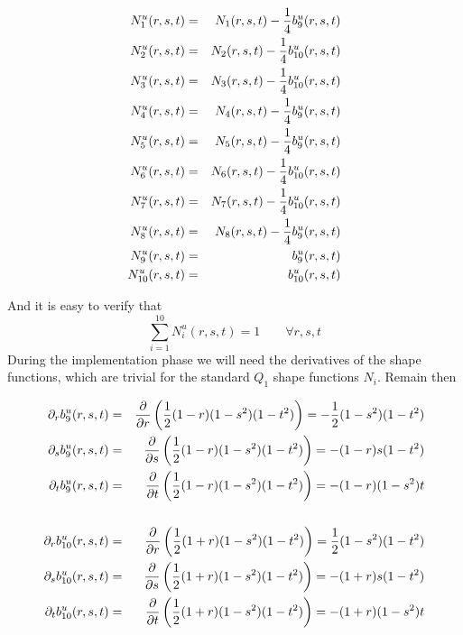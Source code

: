 \begin{mdframed}[backgroundcolor=blue!5]
\begin{eqnarray}
{N}_1^u(r,s,t) &=&  N_1(r,s,t) - \frac{1}{4} b_9^u(r,s,t)\nonumber\\
{N}_2^u(r,s,t) &=&  N_2(r,s,t) - \frac{1}{4} b_{10}^u(r,s,t)\nonumber\\
{N}_3^u(r,s,t) &=&  N_3(r,s,t) - \frac{1}{4} b_{10}^u(r,s,t)\nonumber\\
{N}_4^u(r,s,t) &=&  N_4(r,s,t) - \frac{1}{4} b_9^u(r,s,t)\nonumber\\
{N}_5^u(r,s,t) &=&  N_5(r,s,t) - \frac{1}{4} b_9^u(r,s,t)\nonumber\\
{N}_6^u(r,s,t) &=&  N_6(r,s,t) - \frac{1}{4} b_{10}^u(r,s,t)\nonumber\\
{N}_7^u(r,s,t) &=&  N_7(r,s,t) - \frac{1}{4} b_{10}^u(r,s,t)\nonumber\\
{N}_8^u(r,s,t) &=&  N_8(r,s,t) - \frac{1}{4} b_9^u(r,s,t)\nonumber\\
{N}_9^u(r,s,t) &=&  b_9^u(r,s,t)\nonumber\\
{N}_{10}^u(r,s,t) &=&  b_{10}^u(r,s,t) \nonumber
\end{eqnarray}
\end{mdframed}
And it is easy to verify that  
\[
\sum_{i=1}^{10} {N}_i^u(r,s,t) = 1  \qquad \forall r,s,t
\]
During the implementation phase we will need the derivatives of the shape functions, 
which are trivial for the standard $Q_1$ shape functions $N_i$. Remain then 


\begin{eqnarray}
\partial_r b_9^u(r,s,t) 
&=& \frac{\partial }{\partial r}  \left( \frac{1}{2}(1-r)(1-s^2)(1-t^2) \right) 
=  -\frac{1}{2}(1-s^2)(1-t^2)  \nonumber\\
\partial_s b_9^u(r,s,t) 
&=& \frac{\partial }{\partial s}  \left( \frac{1}{2}(1-r)(1-s^2)(1-t^2) \right) 
=  -(1-r)s(1-t^2)  \nonumber\\
\partial_t b_9^u(r,s,t) 
&=& \frac{\partial }{\partial t}  \left( \frac{1}{2}(1-r)(1-s^2)(1-t^2) \right) 
=  -(1-r)(1-s^2)t  \nonumber\\ \nonumber\\
\partial_r b_{10}^u(r,s,t) 
&=& \frac{\partial }{\partial r}  \left( \frac{1}{2}(1+r)(1-s^2)(1-t^2) \right) 
=  \frac{1}{2}(1-s^2)(1-t^2)  \nonumber\\
\partial_s b_{10}^u(r,s,t) 
&=& \frac{\partial }{\partial s}  \left( \frac{1}{2}(1+r)(1-s^2)(1-t^2) \right) 
=  -(1+r)s(1-t^2)  \nonumber\\
\partial_t b_{10}^u(r,s,t) 
&=& \frac{\partial }{\partial t}  \left( \frac{1}{2}(1+r)(1-s^2)(1-t^2) \right) 
=  -(1+r)(1-s^2)t  \nonumber
\end{eqnarray}

